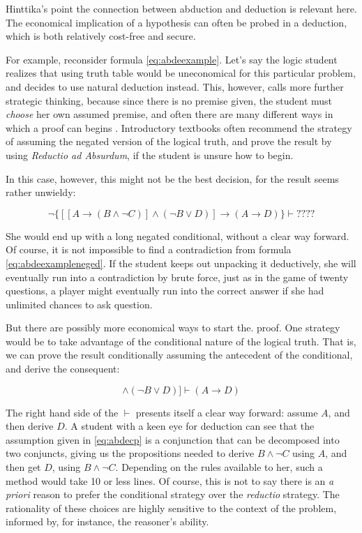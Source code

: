 Hinttika's point the connection between abduction and deduction is relevant here. The economical implication of a hypothesis can often be probed in a deduction, which is both relatively cost-free and secure. 

For example, reconsider formula \ref{eq:abdeexample}. Let's say the logic student realizes that using truth table would be uneconomical for this particular problem, and decides to use natural deduction instead. This, however, calls more further strategic thinking, because since there is no premise given, the student must \emph{choose} her own assumed premise, and often there are many different ways in which a proof can begins . Introductory textbooks often recommend the strategy of  assuming the negated version of the logical truth, and prove the result by using \emph{Reductio ad Absurdum}, if the student is unsure how to begin.

 In this case, however, this might not be the best decision, for the result seems rather unwieldy:
 
 \begin{equation}
	  \neg \{[[A\to(B\wedge \neg C)] \wedge (\neg B \vee D) ]\to (A\to D)\}\vdash ????
	\label{eq:abdeexampleneged}
\end{equation}

She would end up with a long negated conditional, without a clear way forward. Of course, it is not impossible to find a contradiction from  formula \ref{eq:abdeexampleneged}. If the student keeps out unpacking it deductively, she will eventually run into a contradiction by brute force, just as in the game of twenty questions, a player might eventually run into the correct answer if she had unlimited chances to ask question. 

But there are possibly more economical ways to start the. proof.  One strategy would be to take advantage of the conditional nature of the logical truth. That is, we can prove the result conditionally assuming the antecedent of the conditional, and derive the consequent:

\begin{equation}
	 [[A\to(B\wedge \neg C)] \wedge (\neg B \vee D) ]\vdash (A\to D)
	\label{eq:abdecp}
\end{equation}

The right hand side of the $\vdash$ presents itself a clear way forward: assume $A$, and then derive $D$.  A student with a keen eye for deduction can see that the assumption given in \ref{eq:abdecp} is a conjunction that can be decomposed into two conjuncts, giving us the propositions needed to derive $B\wedge \neg C$ using $A$, and then get $D$, using $B\wedge \neg C$.  Depending on the rules available to her, such a method would take 10 or less lines. Of course, this is not to say there is an \emph{a priori} reason to prefer the conditional strategy over the \emph{reductio} strategy. The rationality of these choices are highly sensitive to the context of the problem, informed by, for instance, the reasoner's ability. 

